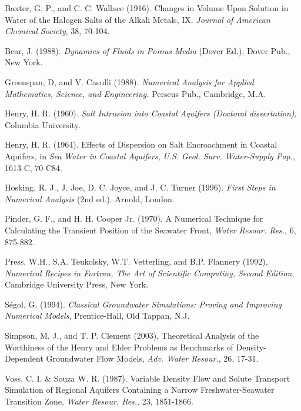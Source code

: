 \documentclass{article}
\begin{document}
\begin{thebibliography}{30}
    Baxter, G. P., and C. C. Wallace (1916). Changes in Volume 
    Upon Solution in Water of the Halogen Salts of the Alkali Metals, IX. 
     \textit{Journal of American Chemical Society}, 38, 70-104.

    Bear, J. (1988). \textit{Dynamics of Fluids in Porous Media} 
    (Dover Ed.), Dover Pub., New York.

    Greenspan, D, and V. Casulli (1988). \textit{Numerical 
    Analysis for Applied Mathematics, Science, and Engineering.} Perseus Pub., 
    Cambridge, M.A.

    Henry, H. R. (1960). \textit{Salt Intrusion into Coastal 
    Aquifers (Doctoral dissertation),} Columbia University.

    Henry, H. R. (1964). Effects of Dispersion on Salt 
    Encroachment in Coastal Aquifers, in \textit{Sea Water in Coastal Aquifers},
     \textit{U.S. Geol. Surv. Water-Supply Pap.}, 1613-C, 70-C84.

    Hosking, R. J., J. Joe, D. C. Joyce, and J. C. Turner 
    (1996). \textit{First Steps in Numerical Analysis} (2nd ed.).
    Arnold, London. 

    Pinder, G. F., and H. H. Cooper Jr. (1970). A Numerical 
    Technique for Calculating the Transient Position of the Seawater Front, 
     \textit{Water Resour. Res.}, 6, 875-882.

    Press, W.H., S.A. Teukolsky, W.T. Vetterling, and B.P. Flannery 
    (1992), \textit{Numerical Recipes in Fortran, The Art of Scientific Computing, 
    Second Edition}, Cambridge University Press, New York.

    S\'egol, G. (1994). \textit{Classical Groundwater Simulations: 
    Proving and Improving Numerical Models}, Prentice-Hall, Old Tappan, N.J. 

    Simpson, M. J., and T. P. Clement (2003), 
    Theoretical Analysis of the Worthiness of the Henry and Elder Problems as 
    Benchmarks of Density-Dependent Groundwater Flow Models, \textit{Adv. Water 
    Resour.}, 26, 17-31.

    Voss, C. I. \& Souza W. R. (1987). Variable Density Flow and 
    Solute Transport Simulation of Regional Aquifers Containing a Narrow 
    Freshwater-Seawater Transition Zone, \textit{Water Resour. Res.}, 23, 
    1851-1866.
\end{thebibliography}
\end{document}

